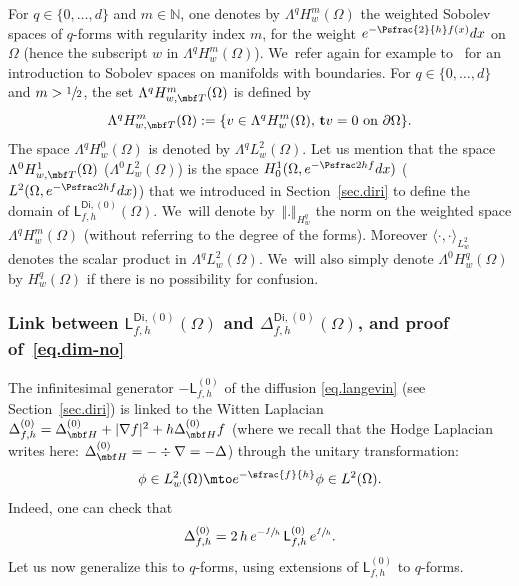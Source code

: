 For $q\in \{0, \ldots,d\}$ and $m\in \mathbb N$, one denotes by
$\Lambda^qH^m_w(\Omega)$\label{page.wsobolevq} the weighted Sobolev spaces of $q$-forms with
regularity index $m$, for the weight $e^{-\Psfrac{2}{h} f(x)}dx$ on
$\Omega$ (hence the subscript $w$ in $\Lambda^qH^m_w(\Omega)$). We~refer again for example to~\cite{GSchw} for an introduction to Sobolev spaces on manifolds with boundaries. For $q\in\{0,\ldots,d\}$ and $m> \sfrac{1}{2}$, the set $\Lambda^qH^m_{w,\mbf T}(\Omega)$ is defined by
\[
\Lambda^qH^m_{w,\mbf T}(\Omega):=\{v\in \Lambda^qH^m_w(\Omega),\, \mathbf tv=0 \text{ on }\partial \Omega\}.
\]
The space
$\Lambda^qH^0_w(\Omega)$ is denoted by $\Lambda^qL^2_w(\Omega)$. Let us mention that the space $\Lambda^0H^1_{w,\mbf T}(\Omega)$ (\resp $\Lambda^0L^2_w(\Omega)$) is
the space $H^{1}_{0}(\Omega,e^{-\Psfrac 2h f}dx)$ (\resp $L^2(\Omega,e^{-\Psfrac 2h f}dx)$) that we introduced in Section~\ref{sec.diri} to
define the domain of $\mathsf L^{\mathsf{Di},(0)}_{f,h}(\Omega)$. We~will denote by~$\Vert. \Vert_{H^q_w}$ the norm on the weighted space $\Lambda^qH^m_w
(\Omega)$ (without referring to the degree of the forms). Moreover $\langle
\cdot, \cdot\rangle_{L^2_w}$ denotes the scalar product in $\Lambda^qL^2_w (\Omega)$. We~will also simply denote $\Lambda^0H^q_w(\Omega)$ by $H^q_w(\Omega)$ if there is no possibility for confusion.

\subsubsection{Link between $\mathsf L^{\mathsf{Di}, (0)}_{f,h}(\Omega)$ and $\Delta^{\mathsf{Di}, (0)}_{f,h}(\Omega)$, and proof of~\eqref{eq.dim-no}}

The infinitesimal generator $-\mathsf L^{(0)}_{f,h}$ of the diffusion
\eqref{eq.langevin} (see Section~\ref{sec.diri}) is linked to the
Witten Laplacian $\Delta^{(0)}_{f,h} = \Delta^{(0)}_{\mbf H} +\vert
\nabla f\vert^2+h\Delta^{(0)}_{\mbf H}f$ (where we recall that the
Hodge Laplacian writes here: $\Delta^{(0)}_{\mbf H}=-\div \nabla=-\Delta$)
through the unitary transformation:
\[
\phi \in L^2_w(\Omega) \mto e^{-\sfrac{f}{h}} \phi \in L^2(\Omega).
\]
Indeed, one can check that
\begin{equation}\label{eq:unitary_p0}
\Delta^{ (0)}_{f,h} = 2\, h \, e^{-\sfrac{f}{h}} \, \mathsf L^{(0)}_{f,h} \, e^{\sfrac{f}{h}}.
\end{equation}
Let us now generalize this to $q$-forms, using extensions of
$\mathsf L^{(0)}_{f,h}$ to $q$-forms.

